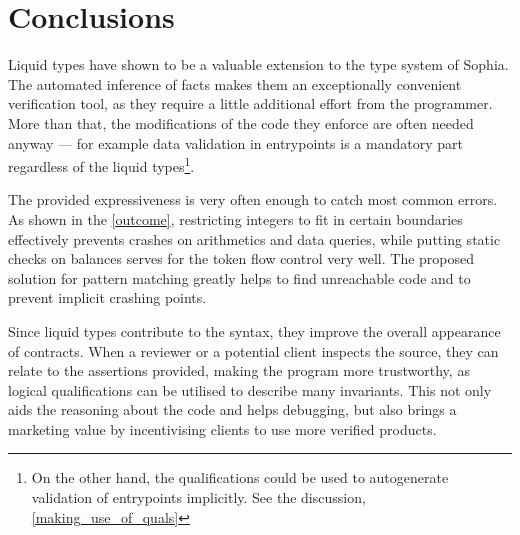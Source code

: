 \chapter{Conclusions}

Liquid types have shown to be a valuable extension to the type system of Sophia.
The automated inference of facts makes them an exceptionally convenient
verification tool, as they require a little additional effort from the
programmer. More than that, the modifications of the code they enforce are often
needed anyway --- for example data validation in entrypoints is a mandatory part
regardless of the liquid types\footnote{On the other hand, the qualifications
  could be used to autogenerate validation of entrypoints implicitly. See the
  discussion, \autoref{making_use_of_quals}}.

The provided expressiveness is very often enough to catch most common errors. As
shown in the \autoref{outcome}, restricting integers to fit in certain
boundaries effectively prevents crashes on arithmetics and data queries, while
putting static checks on balances serves for the token flow control very well.
The proposed solution for pattern matching greatly helps to find unreachable
code and to prevent implicit crashing points.

Since liquid types contribute to the syntax, they improve the overall appearance
of contracts. When a reviewer or a potential client inspects the source, they
can relate to the assertions provided, making the program more trustworthy, as
logical qualifications can be utilised to describe many invariants. This not
only aids the reasoning about the code and helps debugging, but also brings a
marketing value by incentivising clients to use more verified products.
